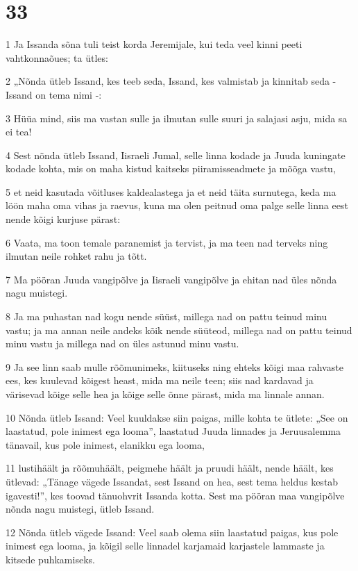 \chapter{33}

\par 1 Ja Issanda sõna tuli teist korda Jeremijale, kui teda veel kinni peeti vahtkonnaõues; ta ütles:
\par 2 „Nõnda ütleb Issand, kes teeb seda, Issand, kes valmistab ja kinnitab seda - Issand on tema nimi -:
\par 3 Hüüa mind, siis ma vastan sulle ja ilmutan sulle suuri ja salajasi asju, mida sa ei tea!
\par 4 Sest nõnda ütleb Issand, Iisraeli Jumal, selle linna kodade ja Juuda kuningate kodade kohta, mis on maha kistud kaitseks piiramisseadmete ja mõõga vastu,
\par 5 et neid kasutada võitluses kaldealastega ja et neid täita surnutega, keda ma löön maha oma vihas ja raevus, kuna ma olen peitnud oma palge selle linna eest nende kõigi kurjuse pärast:
\par 6 Vaata, ma toon temale paranemist ja tervist, ja ma teen nad terveks ning ilmutan neile rohket rahu ja tõtt.
\par 7 Ma pööran Juuda vangipõlve ja Iisraeli vangipõlve ja ehitan nad üles nõnda nagu muistegi.
\par 8 Ja ma puhastan nad kogu nende süüst, millega nad on pattu teinud minu vastu; ja ma annan neile andeks kõik nende süüteod, millega nad on pattu teinud minu vastu ja millega nad on üles astunud minu vastu.
\par 9 Ja see linn saab mulle rõõmunimeks, kiituseks ning ehteks kõigi maa rahvaste ees, kes kuulevad kõigest heast, mida ma neile teen; siis nad kardavad ja värisevad kõige selle hea ja kõige selle õnne pärast, mida ma linnale annan.
\par 10 Nõnda ütleb Issand: Veel kuuldakse siin paigas, mille kohta te ütlete: „See on laastatud, pole inimest ega looma”, laastatud Juuda linnades ja Jeruusalemma tänavail, kus pole inimest, elanikku ega looma,
\par 11 lustihäält ja rõõmuhäält, peigmehe häält ja pruudi häält, nende häält, kes ütlevad: „Tänage vägede Issandat, sest Issand on hea, sest tema heldus kestab igavesti!”, kes toovad tänuohvrit Issanda kotta. Sest ma pööran maa vangipõlve nõnda nagu muistegi, ütleb Issand.
\par 12 Nõnda ütleb vägede Issand: Veel saab olema siin laastatud paigas, kus pole inimest ega looma, ja kõigil selle linnadel karjamaid karjastele lammaste ja kitsede puhkamiseks.
